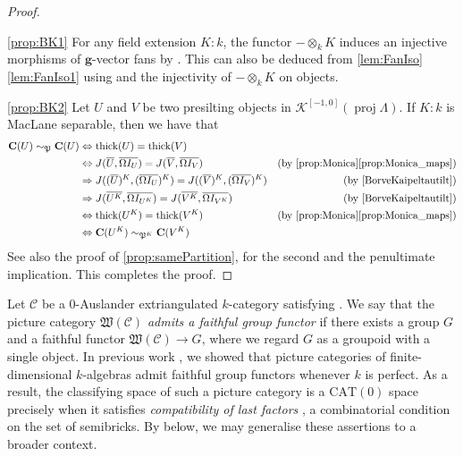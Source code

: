 \documentclass[10pt,twoside, a4paper,reqno]{amsart}
\DeclareMathOperator{\thick}{thick}
\DeclareMathOperator{\proj}{proj}
\newcommand{\Ktwo}{\mathcal{K}^{[-1,0]}}
\newcommand{\Wfrak}{\mathfrak{W}}
\newcommand{\Pfrak}{\mathfrak{P}}
\newcommand{\calC}{\mathcal{C}}
\newcommand{\boldC}{\mathbf{C}}
\newcommand{\bfg}{\mathbf{g}}
\theoremstyle{definition}
\begin{document}
\begin{proof} \, 

    \eqref{prop:BK1} For any field extension $K:k$, the functor $- \otimes_k K$ induces an injective morphisms of $\bfg$-vector fans by \cite[Thm. 2.18]{BorveKaipeltautilt}. This can also be deduced from \cref{lem:FanIso}\eqref{lem:FanIso1} using \cite[Prop. 6.6, Cor. 6.7]{DIJ2019} and the injectivity of $- \otimes_k K$ on objects.
    
    \eqref{prop:BK2} Let $U$ and $V$ be two presilting objects in $\Ktwo(\proj \Lambda)$. {If $K:k$ is MacLane separable}, {then we have that
    \begin{align*}
        \boldC(U) \sim_{\Pfrak} \boldC(U) & \Leftrightarrow \thick(U) = \thick(V) \\
        & \Leftrightarrow J(\overline{U},\overline{\Omega I_U}) = J(\overline{V},\overline{\Omega I_V}) & \text{(by \cref{prop:Monica}\eqref{prop:Monica_maps})}\\
        & \Rightarrow J((\overline{U})^K,(\overline{\Omega I_U})^K) = J((\overline{V})^K,(\overline{\Omega I_V})^K) & \text{(by \cite[Prop. 4.9]{BorveKaipeltautilt})} \\
        & \Rightarrow J(\overline{U^K},\overline{\Omega I_{U^K}}) = J(\overline{V^K},\overline{\Omega I_{V^K}}) & \text{(by \cite[Lem. 2.7]{BorveKaipeltautilt})} \\
        & \Leftrightarrow \thick(U^K) = \thick(V^K) & \text{(by \cref{prop:Monica}\eqref{prop:Monica_maps})} \\
        & \Leftrightarrow \boldC(U^K) \sim_{\Pfrak^K} \boldC(V^K)
    \end{align*}
    See also the proof of \cref{prop:samePartition}, for the second and the penultimate implication. This completes the proof.}
\end{proof}

Let $\calC$ be a 0-Auslander extriangulated $k$-category satisfying . We say that the picture category $\Wfrak(\calC)$ \textit{admits a faithful group functor} if there exists a group $G$ and a faithful functor $\Wfrak(\calC)\xrightarrow{}G$, where we regard $G$ as a groupoid with a single object. In previous work \cite{BorMot,BorveKaipeltautilt}, we showed that picture categories of finite-dimensional $k$-algebras admit faithful group functors whenever $k$ is perfect. As a result, the classifying space of such a picture category is a $\mathrm{CAT}(0)$ space precisely when it satisfies \textit{compatibility of last factors} \cite{BH21,Igu14}, a combinatorial condition on the set of semibricks. By  below, we may generalise these assertions to a broader context.
\end{document}
